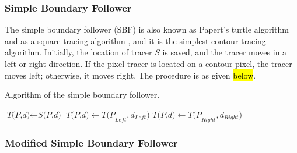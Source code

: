\documentclass[sensors,article,accept,moreauthors,pdftex,10pt,a4paper]{mdpi}
\begin{document}
\subsubsection{Simple Boundary Follower}


The simple boundary follower (SBF) is also known as Papert's turtle algorithm \cite{Papert1973Uses} and as a square-tracing algorithm \cite{Ghuneim2015Contour}, and it is the simplest contour-tracing algorithm. Initially, the location of tracer $S$ is saved, and the tracer moves in a left or right direction. If the pixel tracer is located on a contour pixel, the tracer moves left; otherwise, it moves right. The procedure is as given \hl{below}.

\begin{algorithm}[H]
	\caption{Algorithm of the simple boundary follower.}\label{alg:sbf}
	\begin{algorithmic}[1]
	\begin{spacing}{1.5}
	\State $\textit{T(P,d)} \gets \textit{S(P,d)}$
	\Do
	\State $\textit{T(P,d)} \gets \textit{T(P}_{Left},\textit{d}_{Left} ) $
	\Else
	\State $\textit{T(P,d)} \gets \textit{T(P}_{Right},\textit{d}_{Right})$
	\EndIf
	\EndProcedure\vspace{-12pt}
	\end{spacing}
	\end{algorithmic}
\end{algorithm}

\subsubsection{Modified Simple Boundary Follower}

\end{document}
